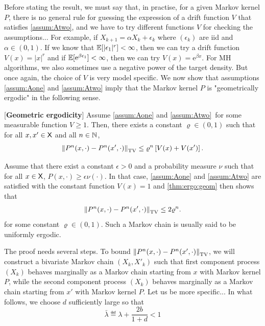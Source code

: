 \documentclass[english,graybox,envcountchap,envcountsame,sectrefs,shortlabels]{svmono}
\theoremstyle{style}
\newcommand{\rme}{\mathrm{e}}
\begin{document}
Before stating the result, we must say that, in practise, for a given Markov kernel $P$, there is no general rule for guessing the expression of a drift function $V$ that satisfies \ref{assum:Atwo}, and we have to try different functions $V$ for checking the assumptions... For example, if $X_{k+1}=\alpha X_k+\epsilon_k$ where $(\epsilon_k)$ are iid and $\alpha\in (0,1)$. If we know that $\mathbb{E}[|\epsilon_1|^r]<\infty$, then we can try a drift function $V(x)=|x|^r$ and if $\PE[\rme^{\beta \epsilon_1}]<\infty$, then we can  try $V(x)=\rme^{\beta x}$. For MH algorithms, we also sometimes use a negative power of the target density. But once again, the choice of $V$ is very model specific.
We now show that assumptions \ref{assum:Aone} and \ref{assum:Atwo} imply that the Markov kernel $P$ is "geometrically ergodic" in the following sense.
\begin{theorem}\label{thm:ergo:geom} [{\bf Geometric ergodicity}] 
Assume \ref{assum:Aone} and \ref{assum:Atwo}\ for some measurable function $V\geq1$.
Then, there exists a constant $\varrho \in (0,1)$ such that for all $x,x'\in\mathsf{X}$ and all $n\in\mathbb{N}$,
$$
\left\|P^n(x,\cdot)-P^n(x',\cdot)\right\|_{\mathrm{TV}} \leq \varrho^n \left[V(x)+V(x')\right]  .
$$
\end{theorem}

\begin{remark}
Assume that there exist a constant $\epsilon>0$ and a probability measure $\nu$ such that for all $x\in\mathsf{X}$, $P(x,\cdot)\geq \epsilon \nu(\cdot)$. In that case, \ref{assum:Aone} and \ref{assum:Atwo} are satisfied with the constant function $V(x)=1$ and \autoref{thm:ergo:geom} then shows that
$$
\left\|P^n(x,\cdot)-P^n(x',\cdot)\right\|_{\mathrm{TV}} \leq 2 \varrho^n  .
$$
for some constant $\varrho\in(0,1)$. Such a Markov chain is usually said to be uniformly ergodic.
\end{remark}
The proof needs several steps. To bound $\left\|P^n(x,\cdot)-P^n(x',\cdot)\right\|_{\mathrm{TV}}$, we will construct a bivariate Markov chain $(X_k,X'_k)$ such that first component process $(X_k)$ behaves marginally as a Markov chain starting from $x$ with Markov kernel $P$, while the second component process $(X_k)$ behaves marginally as a Markov chain starting from $x'$ with Markov kernel $P$. Let us be more specific...
 In what follows, we choose $d$ sufficiently large so that
 \begin{equation}\label{eq:def:barlambda}
 \bar \lambda \eqdef \lambda +\frac{2b}{1+d}<1
 \end{equation}
\end{document}
